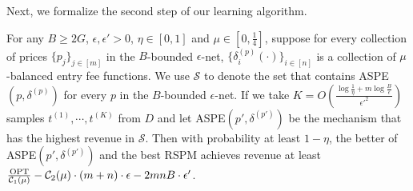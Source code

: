 Next, we formalize the second step of our learning algorithm.
\begin{lemma}\label{lem:learn best ASPE}
	For any $B\geq 2G$, $\epsilon, \epsilon'>0$,  $\eta\in [0,1]$ and $\mu\in[0,\frac{1}{4}]$, suppose for every collection of prices $\{p_j\}_{j\in[m]}$ in the $B$-bounded $\epsilon$-net, $\{\delta^{(p)}_i(\cdot)\}_{i\in[n]}$ is a collection of $\mu$-balanced entry fee functions. We use $\mathcal{S}$ to denote the set that contains ASPE$(p,\delta^{(p)})$ for every $p$ in the $B$-bounded $\epsilon$-net. If we take %
	$K=O\left(\frac{\log \frac{1}{\eta}+m\log \frac{B}{\epsilon}}{\epsilon'^2}\right)$ samples $t^{(1)},\cdots, t^{(K)}$ from $D$ and let ASPE$(p',\delta^{(p')})$ be the mechanism that has the highest revenue in $\mathcal{S}$. Then with probability at least $1-\eta$, the better of ASPE$(p',\delta^{(p')})$ and the best RSPM achieves revenue at least $\frac{\text{OPT}}{{\mathcal{C}}_1(\mu)}-{\mathcal{C}}_2(\mu)\cdot (m+n)\cdot \epsilon-2mnB\cdot \epsilon'$. 
\end{lemma}

